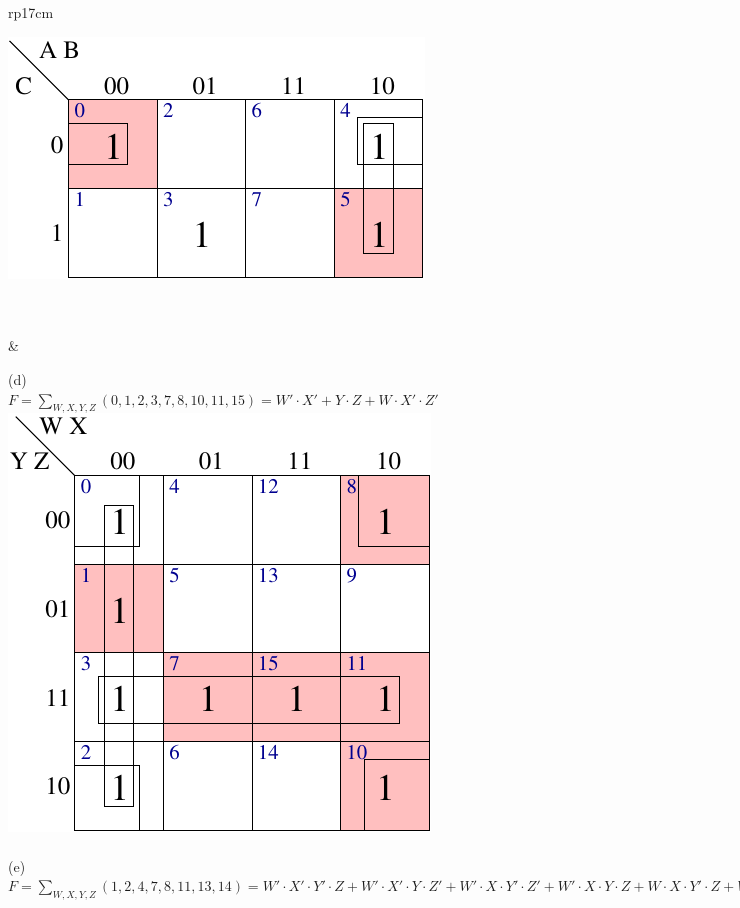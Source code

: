 \documentclass{article}
\begin{document}
\begin{longtable}[l]{rp{17cm}}
\begin{minipage}[t]{\linewidth}
\includegraphics{../CombinationalCircuits/Assessments/wakerly_4_15_c}\\ \\
\end{minipage}\\
&\begin{minipage}[t]{\linewidth}
(d)\\
$F=\sum_{W,X,Y,Z}(0,1,2,3,7,8,10,11,15)=W' \cdot X' + Y \cdot Z + W \cdot X' \cdot Z'$\\
\includegraphics{../CombinationalCircuits/Assessments/wakerly_4_15_d}\\ \\
(e)\\
$F=\sum_{W,X,Y,Z}(1,2,4,7,8,11,13,14)=W' \cdot X' \cdot Y' \cdot Z + W' \cdot X' \cdot Y \cdot Z' + W' \cdot X \cdot Y' \cdot Z' + W' \cdot X \cdot Y \cdot Z + W \cdot X \cdot Y' \cdot Z + W \cdot X \cdot Y \cdot Z' + W \cdot X' \cdot Y' \cdot Z' + W \cdot X' \cdot Y \cdot Z$\\

\end{minipage}
\end{longtable}
\end{document}
